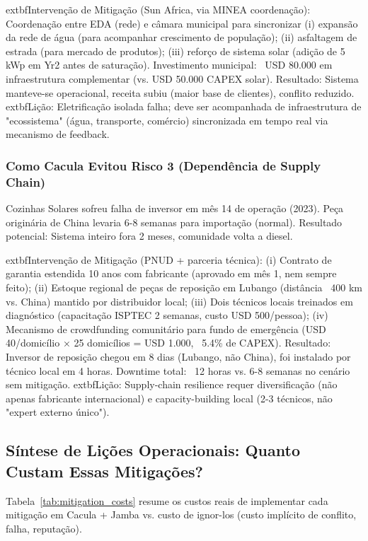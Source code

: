 \documentclass[12pt, a4paper]{article}
\begin{document}
{{{{{{{{{{{{	extbf{Intervenção de Mitigação (Sun Africa, via MINEA coordenação)}: Coordenação entre EDA (rede) e câmara municipal para sincronizar (i) expansão da rede de água (para acompanhar crescimento de população); (ii) asfaltagem de estrada (para mercado de produtos); (iii) reforço de sistema solar (adição de 5 kWp em Yr2 antes de saturação). Investimento municipal: ~USD 80.000 em infraestrutura complementar (vs. USD 50.000 CAPEX solar). Resultado: Sistema manteve-se operacional, receita subiu (maior base de clientes), conflito reduzido. 	extbf{Lição}: Eletrificação isolada falha; deve ser acompanhada de infraestrutura de "ecossistema" (água, transporte, comércio) sincronizada em tempo real via mecanismo de feedback.

\subsubsection*{Como Cacula Evitou Risco 3 (Dependência de Supply Chain)}

Cozinhas Solares sofreu falha de inversor em mês 14 de operação (2023). Peça originária de China levaria 6-8 semanas para importação (normal). Resultado potencial: Sistema inteiro fora 2 meses, comunidade volta a diesel.

	extbf{Intervenção de Mitigação (PNUD + parceria técnica)}: (i) Contrato de garantia estendida 10 anos com fabricante (aprovado em mês 1, nem sempre feito); (ii) Estoque regional de peças de reposição em Lubango (distância ~400 km vs. China) mantido por distribuidor local; (iii) Dois técnicos locais treinados em diagnóstico (capacitação ISPTEC 2 semanas, custo USD 500/pessoa); (iv) Mecanismo de crowdfunding comunitário para fundo de emergência (USD 40/domicílio × 25 domicílios = USD 1.000, ~5.4\% de CAPEX). Resultado: Inversor de reposição chegou em 8 dias (Lubango, não China), foi instalado por técnico local em 4 horas. Downtime total: ~12 horas vs. 6-8 semanas no cenário sem mitigação. 	extbf{Lição}: Supply-chain resilience requer diversificação (não apenas fabricante internacional) e capacity-building local (2-3 técnicos, não "expert externo único").

\subsection{Síntese de Lições Operacionais: Quanto Custam Essas Mitigações?}

Tabela~\ref{tab:mitigation_costs} resume os custos reais de implementar cada mitigação em Cacula + Jamba vs. custo de ignor-los (custo implícito de conflito, falha, reputação).

}}}}}}}}}}}}
\end{document}
